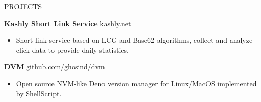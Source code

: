 \documentclass{resume} %
\begin{document}
\begin{rSection}{PROJECTS}
\vspace{-1.25em}


\item \textbf{Kashly Short Link Service} {} \hfill \href{https://kashly.net}{kashly.net}
\begin{itemize}
  \itemsep -5pt {}
  \item Short link service based on LCG and Base62 algorithms, collect and analyze click data to provide daily statistics.
\end{itemize}

\item \textbf{DVM} {} \hfill \href{https://github.com/ghosind/dvm}{github.com/ghosind/dvm}
\begin{itemize}
  \itemsep -5pt {}
  \item Open source NVM-like Deno version manager for Linux/MacOS implemented by ShellScript.
\end{itemize}

\end{rSection}
\end{document}
